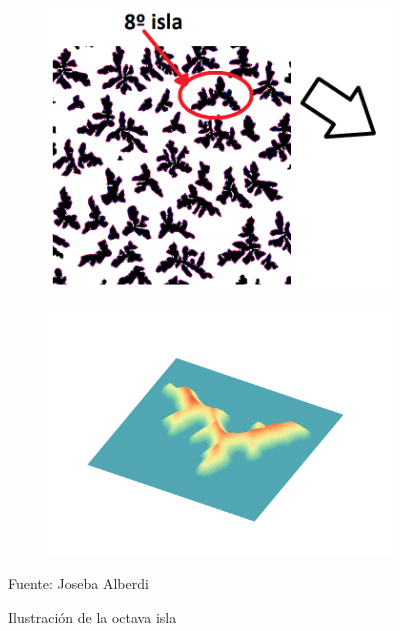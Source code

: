 \begin{figure}[H]
	\captionsetup{justification=centering}
	\centering
	\begin{subfigure}[t]{2.6in}
		\centering
		\includegraphics[width=1.3\textwidth]{./imagenes/tiendaAux}
		\subcaption{}\label{tienda_aux}
	\end{subfigure}	
	\begin{subfigure}[t]{2.6in}
		\centering
		\includegraphics[width=1.4\textwidth]{./pdfs/surface_raw}	
		\subcaption{}\label{tienda2}
	\end{subfigure}
	\caption{Ilustraci\'{o}n de la octava isla }	
	Fuente: Joseba Alberdi
\end{figure}

